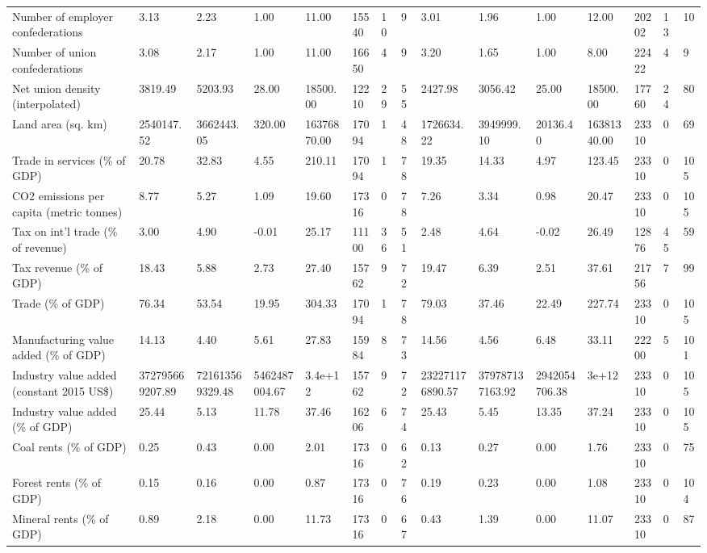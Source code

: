 \begin{longtable}{lllllllllllllll}
\addlinespace
Number of employer confederations & 3.13 & 2.23 & 1.00 & 11.00 & 15540 & 10 & 9 & 3.01 & 1.96 & 1.00 & 12.00 & 20202 & 13 & 10\\
Number of union confederations & 3.08 & 2.17 & 1.00 & 11.00 & 16650 & 4 & 9 & 3.20 & 1.65 & 1.00 & 8.00 & 22422 & 4 & 9\\
Net union density (interpolated) & 3819.49 & 5203.93 & 28.00 & 18500.00 & 12210 & 29 & 55 & 2427.98 & 3056.42 & 25.00 & 18500.00 & 17760 & 24 & 80\\
Land area (sq. km) & 2540147.52 & 3662443.05 & 320.00 & 16376870.00 & 17094 & 1 & 48 & 1726634.22 & 3949999.10 & 20136.40 & 16381340.00 & 23310 & 0 & 69\\
Trade in services (\% of GDP) & 20.78 & 32.83 & 4.55 & 210.11 & 17094 & 1 & 78 & 19.35 & 14.33 & 4.97 & 123.45 & 23310 & 0 & 105\\
\addlinespace
CO2 emissions per capita (metric tonnes) & 8.77 & 5.27 & 1.09 & 19.60 & 17316 & 0 & 78 & 7.26 & 3.34 & 0.98 & 20.47 & 23310 & 0 & 105\\
Tax on int'l trade (\% of revenue) & 3.00 & 4.90 & -0.01 & 25.17 & 11100 & 36 & 51 & 2.48 & 4.64 & -0.02 & 26.49 & 12876 & 45 & 59\\
Tax revenue (\% of GDP) & 18.43 & 5.88 & 2.73 & 27.40 & 15762 & 9 & 72 & 19.47 & 6.39 & 2.51 & 37.61 & 21756 & 7 & 99\\
Trade (\% of GDP) & 76.34 & 53.54 & 19.95 & 304.33 & 17094 & 1 & 78 & 79.03 & 37.46 & 22.49 & 227.74 & 23310 & 0 & 105\\
Manufacturing value added (\% of GDP) & 14.13 & 4.40 & 5.61 & 27.83 & 15984 & 8 & 73 & 14.56 & 4.56 & 6.48 & 33.11 & 22200 & 5 & 101\\
\addlinespace
Industry value added (constant 2015 US\$) & 372795669207.89 & 721613569329.48 & 5462487004.67 & 3.4e+12 & 15762 & 9 & 72 & 232271176890.57 & 379787137163.92 & 2942054706.38 & 3e+12 & 23310 & 0 & 105\\
Industry value added (\% of GDP) & 25.44 & 5.13 & 11.78 & 37.46 & 16206 & 6 & 74 & 25.43 & 5.45 & 13.35 & 37.24 & 23310 & 0 & 105\\
Coal rents (\% of GDP) & 0.25 & 0.43 & 0.00 & 2.01 & 17316 & 0 & 62 & 0.13 & 0.27 & 0.00 & 1.76 & 23310 & 0 & 75\\
Forest rents (\% of GDP) & 0.15 & 0.16 & 0.00 & 0.87 & 17316 & 0 & 76 & 0.19 & 0.23 & 0.00 & 1.08 & 23310 & 0 & 104\\
Mineral rents (\% of GDP) & 0.89 & 2.18 & 0.00 & 11.73 & 17316 & 0 & 67 & 0.43 & 1.39 & 0.00 & 11.07 & 23310 & 0 & 87\\

\end{longtable}
